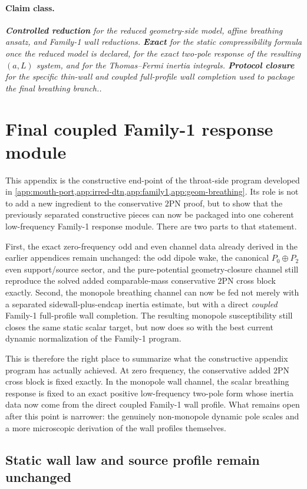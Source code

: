 \documentclass[11pt]{article}
\newcommand{\TwoPN}{\mathrm{2PN}}
\newcommand{\Exact}{\textbf{Exact}}
\newcommand{\Controlled}{\textbf{Controlled reduction}}
\newcommand{\Protocol}{\textbf{Protocol closure}}
\newcommand{\claimclass}[1]{\paragraph{Claim class.}\emph{#1.}}
\begin{document}
\claimclass{\Controlled{} for the reduced geometry-side model, affine breathing ansatz,
and Family-1 wall reductions.
\Exact{} for the static compressibility formula once the reduced model is declared, for
the exact two-pole response of the resulting \((a,L)\) system, and for the
Thomas--Fermi inertia integrals.
\Protocol{} for the specific thin-wall and coupled full-profile wall completion used to
package the final breathing branch.}

\section{Final coupled Family-1 response module}
\label{app:family1-final}

This appendix is the constructive end-point of the throat-side program developed in
\cref{app:mouth-port,app:irred-dtn,app:family1,app:geom-breathing}.
Its role is not to add a new ingredient to the conservative \(\TwoPN\) proof, but to
show that the previously separated constructive pieces can now be packaged into one
coherent low-frequency Family-1 response module.
There are two parts to that statement.

First, the exact zero-frequency odd and even channel data already derived in the earlier
appendices remain unchanged: the odd dipole wake, the canonical
\(P_0\oplus P_2\) even support/source sector, and the pure-potential geometry-closure
channel still reproduce the solved added comparable-mass conservative \(\TwoPN\) cross
block exactly.
Second, the monopole breathing channel can now be fed not merely with a separated
sidewall-plus-endcap inertia estimate, but with a direct \emph{coupled} Family-1
full-profile wall completion.
The resulting monopole susceptibility still closes the same static scalar target,
but now does so with the best current dynamic normalization of the Family-1 program.

This is therefore the right place to summarize what the constructive appendix program has
actually achieved.
At zero frequency, the conservative added \(\TwoPN\) cross block is fixed exactly.
In the monopole wall channel, the scalar breathing response is fixed to an exact positive
low-frequency two-pole form whose inertia data now come from the direct coupled
Family-1 wall profile.
What remains open after this point is narrower: the genuinely non-monopole dynamic pole
scales and a more microscopic derivation of the wall profiles themselves.

\subsection{Static wall law and source profile remain unchanged}
\label{app:family1-final-static-law}
\end{document}
